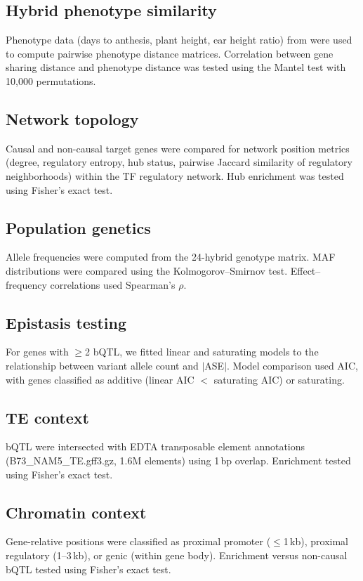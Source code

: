 \documentclass[11pt,a4paper]{article}
\begin{document}
\subsection{Hybrid phenotype similarity}
Phenotype data (days to anthesis, plant height, ear height ratio) from
\citet{engelhorn2025} were used to compute pairwise phenotype distance
matrices. Correlation between gene sharing distance and phenotype distance
was tested using the Mantel test with 10,000 permutations.

\subsection{Network topology}
Causal and non-causal target genes were compared for network position metrics
(degree, regulatory entropy, hub status, pairwise Jaccard similarity of
regulatory neighborhoods) within the TF regulatory network. Hub enrichment
was tested using Fisher's exact test.

\subsection{Population genetics}
Allele frequencies were computed from the 24-hybrid genotype matrix. MAF
distributions were compared using the Kolmogorov--Smirnov test.
Effect--frequency correlations used Spearman's $\rho$.

\subsection{Epistasis testing}
For genes with $\geq$2 bQTL, we fitted linear and saturating models to the
relationship between variant allele count and $|$ASE$|$. Model comparison
used AIC, with genes classified as additive (linear AIC $<$ saturating AIC)
or saturating.

\subsection{TE context}
bQTL were intersected with EDTA transposable element annotations
(B73\_NAM5\_TE.gff3.gz, 1.6M elements) using 1\,bp overlap. Enrichment
tested using Fisher's exact test.

\subsection{Chromatin context}
Gene-relative positions were classified as proximal promoter ($\leq$1\,kb),
proximal regulatory (1--3\,kb), or genic (within gene body). Enrichment
versus non-causal bQTL tested using Fisher's exact test.
\end{document}
